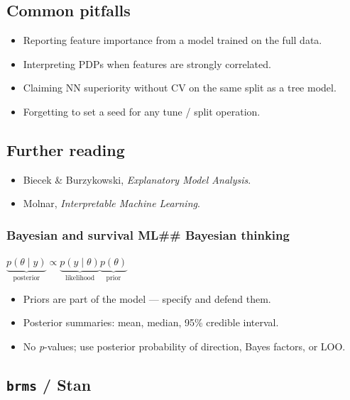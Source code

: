 \documentclass[
]{article}
\providecommand{\tightlist}{%
  \setlength{\itemsep}{0pt}\setlength{\parskip}{0pt}}
\begin{document}
\subsection{Common pitfalls}\label{common-pitfalls-13}

\begin{itemize}
\tightlist
\item
  Reporting feature importance from a model trained on the full data.
\item
  Interpreting PDPs when features are strongly correlated.
\item
  Claiming NN superiority without CV on the same split as a tree model.
\item
  Forgetting to set a seed for any tune / split operation.
\end{itemize}

\subsection{Further reading}\label{further-reading-13}

\begin{itemize}
\tightlist
\item
  Biecek \& Burzykowski, \emph{Explanatory Model Analysis}.
\item
  Molnar, \emph{Interpretable Machine Learning}.
\end{itemize}

\subsubsection{Bayesian and survival ML\#\# Bayesian
thinking}\label{bayesian-and-survival-ml-bayesian-thinking}

\(\underbrace{p(\theta \mid y)}_{\text{posterior}} \propto
 \underbrace{p(y \mid \theta)}_{\text{likelihood}}
 \underbrace{p(\theta)}_{\text{prior}}\)

\begin{itemize}
\tightlist
\item
  Priors are part of the model --- specify and defend them.
\item
  Posterior summaries: mean, median, 95\% credible interval.
\item
  No \emph{p}-values; use posterior probability of direction, Bayes
  factors, or LOO.
\end{itemize}

\subsection{\texorpdfstring{\texttt{brms} /
Stan}{brms / Stan}}\label{brms-stan}
\end{document}
